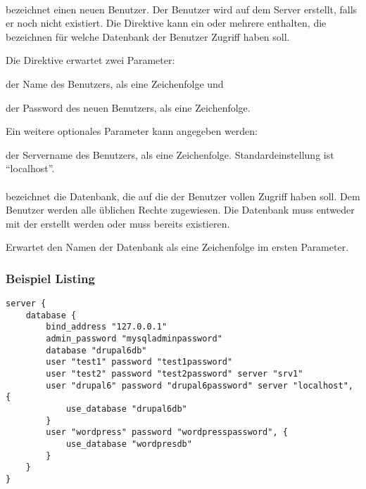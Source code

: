 \paragraph{}

bezeichnet einen neuen Benutzer. Der Benutzer wird auf dem Server erstellt, falls er
noch nicht existiert. Die Direktive kann ein oder mehrere 
enthalten, die bezeichnen für welche Datenbank der Benutzer Zugriff haben soll.

Die Direktive erwartet zwei Parameter:

\begin{asparadesc}
\item[\code{name}] der Name des Benutzers, als eine Zeichenfolge und
\item[\code{password}] der Password des neuen Benutzers, als eine Zeichenfolge.
\end{asparadesc}

Ein weitere optionales Parameter kann angegeben werden:

\begin{asparadesc}
\item[\code{server}] der Servername des Benutzers, als eine Zeichenfolge. Standardeinstellung
ist ``localhost''.
\end{asparadesc}

\paragraph{}

bezeichnet die Datenbank, die auf die der Benutzer vollen Zugriff haben soll. Dem Benutzer
werden alle üblichen Rechte zugewiesen. Die Datenbank muss entweder mit der 
erstellt werden oder muss bereits existieren.

Erwartet den Namen der Datenbank als eine Zeichenfolge im ersten Parameter.

\subsubsection*{Beispiel Listing}

\begin{lstlisting}[style=Java, caption=Beispiel Database Script]
server {
    database {
        bind_address "127.0.0.1"
        admin_password "mysqladminpassword"
        database "drupal6db"
        user "test1" password "test1password"
        user "test2" password "test2password" server "srv1"
        user "drupal6" password "drupal6password" server "localhost", {
            use_database "drupal6db"
        }
        user "wordpress" password "wordpresspassword", {
            use_database "wordpresdb"
        }
    }
}
\end{lstlisting}


